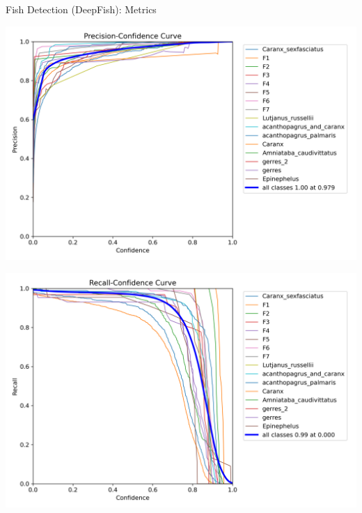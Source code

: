 \documentclass[serif]{beamer}  %
\begin{document}
\begin{frame}{Fish Detection (DeepFish): Metrics}
    \centering

    \begin{minipage}{0.49\linewidth}
        \includegraphics[width=\linewidth]{images/BoxP_curve.png}
    \end{minipage}
    \hfill
    \begin{minipage}{0.49\linewidth}
        \includegraphics[width=\linewidth]{images/BoxR_curve.png}
    \end{minipage}
\end{frame}
\end{document}
